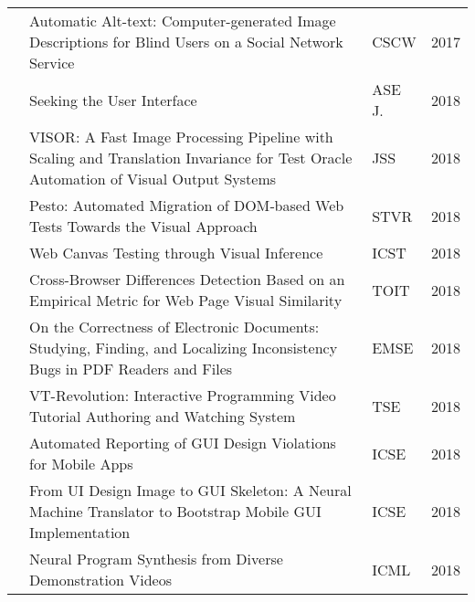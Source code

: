 \begin{sidewaystable}
\begin{tabular}{@{} lp{12.9cm}ll @{}}
\citet{Wu-2017-CSCW}         & Automatic Alt-text: Computer-generated Image Descriptions for Blind Users on a Social Network Service                               & CSCW           & 2017          \\


\citet{Reiss-2018-ASEj}      & Seeking the User Interface                                                                                                          & ASE J.         & 2018          \\
\citet{Kirac-2018-JSS}       & VISOR: A Fast Image Processing Pipeline with Scaling and Translation Invariance for Test Oracle Automation of Visual Output Systems & JSS            & 2018          \\
\citet{Leotta-2018-STVR}     & Pesto: Automated Migration of DOM‐based Web Tests Towards the Visual Approach                                                       & STVR           & 2018          \\
\citet{canvas_icst2018}   & Web Canvas Testing through Visual Inference                                                                                         & ICST           & 2018          \\
\citet{Xu-2018-TOIT}         & Cross-Browser Differences Detection Based on an Empirical Metric for Web Page Visual Similarity                                     & TOIT           & 2018          \\
\citet{Kuchta-2018-EMSE}     & On the Correctness of Electronic Documents: Studying, Finding, and Localizing Inconsistency Bugs in PDF Readers and Files           & EMSE           & 2018          \\
\citet{Bao-2018-TSE}         & VT-Revolution: Interactive Programming Video Tutorial Authoring and Watching System                                                 & TSE            & 2018          \\
\citet{Moran-ICSE-2018}      & Automated Reporting of GUI Design Violations for Mobile Apps                                                                        & ICSE           & 2018          \\

\citet{Chen-2018-ICSE}       & From UI Design Image to GUI Skeleton: A Neural Machine Translator to Bootstrap Mobile GUI Implementation                            & ICSE           & 2018          \\

\citet{Sun-2018-ICML}        & Neural Program Synthesis from Diverse Demonstration Videos                                                                          & ICML           & 2018          \\


\end{tabular}
\end{sidewaystable}
